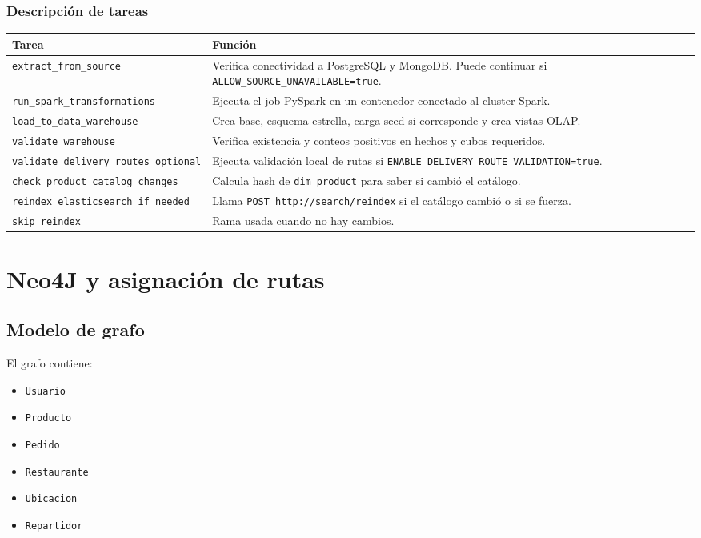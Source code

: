 \documentclass[12pt,letterpaper]{article}
\def\codefile#1{\nolinkurl{#1}}
\begin{document}
\subsubsection{Descripción de tareas}

\begin{longtable}{p{}p{}}
\toprule
\textbf{Tarea} & \textbf{Función}\\
\midrule
\codefile{extract\_from\_source} & Verifica conectividad a PostgreSQL y MongoDB. Puede continuar si \codefile{ALLOW\_SOURCE\_UNAVAILABLE=true}.\\
\codefile{run\_spark\_transformations} & Ejecuta el job PySpark en un contenedor conectado al cluster Spark.\\
\codefile{load\_to\_data\_warehouse} & Crea base, esquema estrella, carga seed si corresponde y crea vistas OLAP.\\
\codefile{validate\_warehouse} & Verifica existencia y conteos positivos en hechos y cubos requeridos.\\
\codefile{validate\_delivery\_routes\_optional} & Ejecuta validación local de rutas si \codefile{ENABLE\_DELIVERY\_ROUTE\_VALIDATION=true}.\\
\codefile{check\_product\_catalog\_changes} & Calcula hash de \codefile{dim\_product} para saber si cambió el catálogo.\\
\codefile{reindex\_elasticsearch\_if\_needed} & Llama \codefile{POST http://search/reindex} si el catálogo cambió o si se fuerza.\\
\codefile{skip\_reindex} & Rama usada cuando no hay cambios.\\
\bottomrule
\end{longtable}

\section{Neo4J y asignación de rutas}

\subsection{Modelo de grafo}

El grafo contiene:

\begin{itemize}
    \item \codefile{Usuario}
    \item \codefile{Producto}
    \item \codefile{Pedido}
    \item \codefile{Restaurante}
    \item \codefile{Ubicacion}
    \item \codefile{Repartidor}
\end{itemize}
\end{document}
